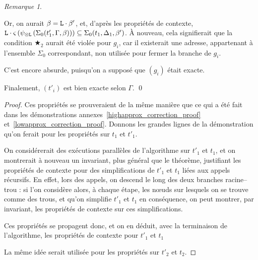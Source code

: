 \documentclass[11pt,a4paper]{article}
\theoremstyle{plain}
\theoremstyle{definition}
\theoremstyle{remark}
\newtheorem{remark}{Remarque}
\newcommand*{\tensor}{\otimes}
\newcommand*{\someperm}{\varsigma}
\newcommand*{\sequent}{\Gamma}
\newcommand*{\sequentbis}{\Delta}
\newcommand*{\Left}{\textnormal{\texttt{L}}}
\newcommand*{\lowapprox}{\ensuremath{\Sigma_0}}
\newcommand*{\exactcondbis}{\bigstar_2}
\begin{document}
\begin{remark}
\begin{itemize}
            Or, on aurait $\beta = \Left \cdot \beta'$, et, d'après les propriétés de contexte, $\Left \cdot \someperm \left( \psi_{\tensor\Left} \left(\lowapprox(t'_1, \sequent, \beta)\right) \right) \subseteq \lowapprox(t_1, \sequentbis_1, \beta')$. À nouveau, cela signifierait que la condition $\exactcondbis$ aurait été violée pour $g_i$, car il existerait une adresse, appartenant à l'ensemble $\lowapprox$ correspondant, non utilisée pour fermer la branche de $g_i$. 
            
            C'est encore absurde, puisqu'on a supposé que $(g_i)$ était exacte.
    \end{itemize}

    Finalement, $(t'_i)$ est bien exacte selon $\sequent$. \qed
\end{remark}

\begin{proof}
    Ces propriétés se prouveraient de la même manière que ce qui a été fait dans les démonstrations annexes~\ref{highapprox_correction_proof} et~\ref{lowapprox_correction_proof}. Donnons les grandes lignes de la démonstration qu'on ferait pour les propriétés sur $t_1$ et $t'_1$.
    
    On considérerait des exécutions parallèles de l'algorithme sur $t'_1$ et $t_1$, et on montrerait à nouveau un invariant, plus général que le théorème, justifiant les propriétés de contexte pour des simplifications de $t'_1$ et $t_1$ liées aux appels récursifs. En effet, lors des appels, on descend le long des deux branches racine--trou : si l'on considère alors, à chaque étape, les n\oe uds sur lesquels on se trouve comme des trous, et qu'on simplifie $t'_1$ et $t_1$ en conséquence, on peut montrer, par invariant, les propriétés de contexte sur ces simplifications.

    Ces propriétés se propagent donc, et on en déduit, avec la terminaison de l'algorithme, les propriétés de contexte pour $t'_1$ et $t_1$
    
    La même idée serait utilisée pour les propriétés sur $t'_2$ et $t_2$.
\end{proof}
\end{document}
